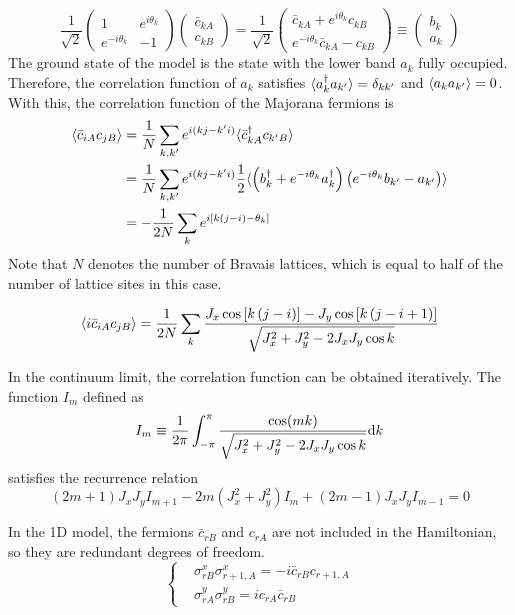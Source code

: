 \[
\frac{1}{\sqrt{2}}
\begin{pmatrix}
    1 & e^{i\theta_k} \\
    e^{-i\theta_k} & -1
\end{pmatrix}
\begin{pmatrix}
    \bar{c}_{kA} \\
    c_{kB}
\end{pmatrix} 
=
\frac{1}{\sqrt{2}}
\begin{pmatrix}
    \bar{c}_{kA} + e^{i\theta_k} c_{kB} \\
    e^{-i\theta_k}\bar{c}_{kA} - c_{kB}
\end{pmatrix}
\equiv
\begin{pmatrix}
    b_k \\
    a_k
\end{pmatrix}
\]
The ground state of the model is the state with the lower band $a_k$ fully occupied. Therefore, the correlation function of $a_k$ satisfies $\langle a^\dagger_k a_{k'} \rangle = \delta_{kk'}$ and $\langle a_k a_{k'} \rangle = 0$. With this, the correlation function of the Majorana fermions is
\begin{align*}
    \langle \bar{c}_{iA} c_{jB} \rangle
    &=
    \frac{1}{N}
    \sum_{k,k'}e^{i(kj - k'i)} \langle \bar{c}_{k A}^\dagger c_{k'B} \rangle \\
    &=
    \frac{1}{N}
    \sum_{k,k'}e^{i(kj - k'i)} 
    \frac{1}{2}
    \langle 
    \left( b_{k}^\dagger + e^{-i\theta_{k}}a_{k}^\dagger \right)
    \left( e^{-i\theta_k}b_{k'} - a_{k'} \right)
     \rangle\\
    &=
    -\frac{1}{2N}
    \sum_{k}
    e^{i\left[ k(j-i) - \theta_k \right]} 
\end{align*}
Note that $N$ denotes the number of Bravais lattices, which is equal to half of the number of lattice sites in this case.

\begin{equation}
    \langle i\bar{c}_{iA} c_{jB} \rangle
    =
    \frac{1}{2N}\sum_{k}
    \frac{
        J_x \cos\left[ k\left( j-i \right) \right] 
        - 
        J_y \cos\left[ k\left( j-i+1 \right) \right] 
    }
    {\sqrt{J_x^2 + J_y^2 - 2J_xJ_y\cos k}}
\end{equation}

In the continuum limit, the correlation function can be obtained iteratively. The function $I_m$ defined as
\[
I_m \equiv 
\frac{1}{2\pi}
\int_{-\pi}^{\pi}
\frac{\cos(mk)}{\sqrt{J_x^2 + J_y^2 - 2J_xJ_y\cos k}} \mathrm{d}k
\]
satisfies the recurrence relation
\[
(2m+1)J_xJ_y I_{m+1}
-
2m(J_x^2 + J_y^2)I_m
+
(2m-1)J_xJ_y I_{m-1}
=
0
\]

In the 1D model, the fermions $\bar{c}_{rB}$ and $c_{rA}$ are not included in the Hamiltonian, so they are redundant degrees of freedom.
\[
\left\{
\begin{aligned}
    & \sigma^x_{rB}\sigma^x_{r+1,A} = -i\bar{c}_{rB} c_{r+1,A} \\
    & \sigma^y_{rA}\sigma^y_{rB} = ic_{rA} \bar{c}_{rB}
\end{aligned}
\right.
\]

